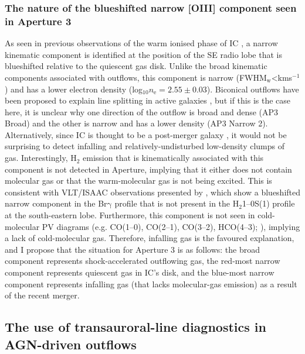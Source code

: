 \subsubsection{The nature of the blueshifted narrow [OIII] component seen in Aperture 3}
\label{section: xshooter_ic5063: discussion: ap3_narrow_component}

As seen in previous observations of the warm ionised phase of IC \citep{Morganti2007}, a narrow kinematic component is identified at the position of the SE radio lobe that is blueshifted relative to the quiescent gas disk. Unlike the broad kinematic components associated with outflows, this component is narrow (\mbox{FWHM$_\mathrm{w}$\;\textless{}\;km\;s$^{-1}$}) and has a lower electron density (log$_{10}n_\mathrm{e}=2.55\pm0.03$). Biconical outflows have been proposed to explain line splitting in active galaxies \citep{Walker1968, Cecil1990}, but if this is the case here, it is unclear why one direction of the outflow is broad and dense (AP3 Broad) and the other is narrow and has a lower density (AP3 Narrow 2). Alternatively, since IC is thought to be a post-merger galaxy \citep{Morganti1998}, it would not be surprising to detect infalling and relatively-undisturbed low-density clumps of gas. Interestingly, H$_2$ emission that is kinematically associated with this component is not detected in Aperture, implying that it either does not contain molecular gas or that the warm-molecular gas is not being excited. This is consistent with VLT/ISAAC observations presented by \citet{Tadhunter2014}, which show a blueshifted narrow component in the Br$\mathrm{\gamma}$ profile that is not present in the H$_2$1--0S(1) profile at the south-eastern lobe. Furthermore, this component is not seen in cold-molecular PV diagrams (e.g. CO(1--0), CO(2--1), CO(3--2), HCO(4--3); \citealt{Morganti2015, Oosterloo2017}), implying a lack of cold-molecular gas. Therefore, infalling gas is the favoured explanation, and I propose that the situation for Aperture 3 is as follows: the broad component represents shock-accelerated outflowing gas, the red-most narrow component represents quiescent gas in IC's disk, and the blue-most narrow component represents infalling gas (that lacks molecular-gas emission) as a result of the recent merger.

\vfill

\subsection{The use of transauroral-line diagnostics in AGN-driven outflows}
\label{section: xshooter_ic5063: discussion: transauroral_lines}

